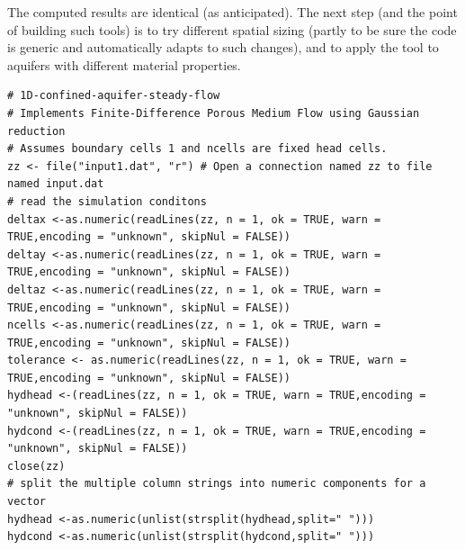  The computed results are identical (as anticipated).  
 The next step (and the point of building such tools) is to try different spatial sizing (partly to be sure the code is generic and automatically adapts to such changes), and to apply the tool to aquifers with different material properties.

\clearpage 
 \begin{lstlisting}[caption= R code demonstrating an Aquifer Flow Simulator for Steady Flow  \\ 
 This version constructs coefficient matrix then solves the linear system. The program uses the same input
 file, label=lst:AquiferFlowSteady1DimensionalLinearSys]
# 1D-confined-aquifer-steady-flow
# Implements Finite-Difference Porous Medium Flow using Gaussian reduction
# Assumes boundary cells 1 and ncells are fixed head cells.
zz <- file("input1.dat", "r") # Open a connection named zz to file named input.dat
# read the simulation conditons
deltax <-as.numeric(readLines(zz, n = 1, ok = TRUE, warn = TRUE,encoding = "unknown", skipNul = FALSE))
deltay <-as.numeric(readLines(zz, n = 1, ok = TRUE, warn = TRUE,encoding = "unknown", skipNul = FALSE))
deltaz <-as.numeric(readLines(zz, n = 1, ok = TRUE, warn = TRUE,encoding = "unknown", skipNul = FALSE))
ncells <-as.numeric(readLines(zz, n = 1, ok = TRUE, warn = TRUE,encoding = "unknown", skipNul = FALSE))
tolerance <- as.numeric(readLines(zz, n = 1, ok = TRUE, warn = TRUE,encoding = "unknown", skipNul = FALSE))
hydhead <-(readLines(zz, n = 1, ok = TRUE, warn = TRUE,encoding = "unknown", skipNul = FALSE))
hydcond <-(readLines(zz, n = 1, ok = TRUE, warn = TRUE,encoding = "unknown", skipNul = FALSE))
close(zz)
# split the multiple column strings into numeric components for a vector
hydhead <-as.numeric(unlist(strsplit(hydhead,split=" ")))
hydcond <-as.numeric(unlist(strsplit(hydcond,split=" ")))


\end{lstlisting}
